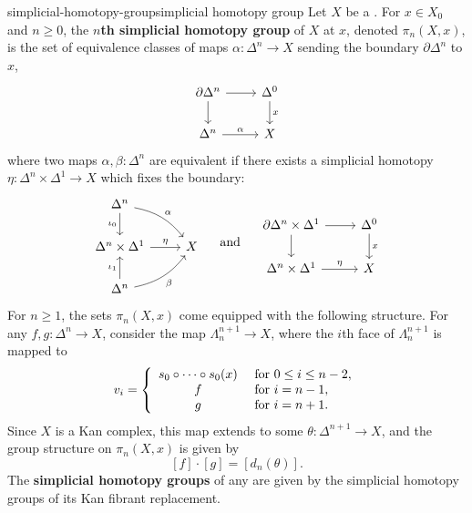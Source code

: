 \begin{topic}{simplicial-homotopy-group}{simplicial homotopy group}
    Let $X$ be a .
    For $x \in X_0$ and $n \ge 0$, the \textbf{$n$th simplicial homotopy group} of $X$ at $x$, denoted $\pi_n(X, x)$, is the set of equivalence classes of maps $\alpha \colon \Delta^n \to X$ sending the boundary $\partial \Delta^n$ to $x$,
    \[ \svg \begin{tikzcd} \partial \Delta^n \arrow{d} \arrow{r} & \Delta^0 \arrow{d}{x} \\ \Delta^n \arrow{r}{\alpha} & X \end{tikzcd} \]
    where two maps $\alpha, \beta \colon \Delta^n$ are equivalent if there exists a simplicial homotopy $\eta \colon \Delta^n \times \Delta^1 \to X$ which fixes the boundary:
    \[ \svg \begin{tikzcd} \Delta^n \arrow[swap]{d}{\iota_0} \arrow[bend left=20]{dr}{\alpha} & \\ \Delta^n \times \Delta^1 \arrow{r}{\eta} & X \\ \Delta^n \arrow{u}{\iota_1} \arrow[swap, bend right=20]{ru}{\beta} \end{tikzcd} \quad \textup{ and } \quad \begin{tikzcd} \partial \Delta^n \times \Delta^1 \arrow{d} \arrow{r} & \Delta^0 \arrow{d}{x} \\ \Delta^n \times \Delta^1 \arrow{r}{\eta} & X \end{tikzcd} \]
    For $n \ge 1$, the sets $\pi_n(X, x)$ come equipped with the following  structure. For any $f, g \colon \Delta^n \to X$, consider the map $\Lambda^{n + 1}_n \to X$, where the $i$th face of $\Lambda^{n + 1}_n$ is mapped to
    \[ v_i = \left\{ \begin{array}{cl}
        s_0 \circ \cdots \circ s_0 (x) & \textup{ for } 0 \le i \le n - 2, \\
        f & \textup{ for } i = n - 1, \\
        g & \textup{ for } i = n + 1.
    \end{array} \right. \]
    Since $X$ is a Kan complex, this map extends to some $\theta \colon \Delta^{n + 1} \to X$, and the group structure on $\pi_n(X, x)$ is given by
    \[ [f] \cdot [g] = [d_n(\theta)] . \]
    The \textbf{simplicial homotopy groups} of any  are given by the simplicial homotopy groups of its Kan fibrant replacement.
\end{topic}

